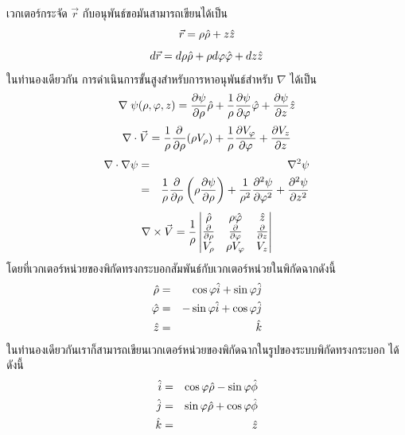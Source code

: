 เวกเตอร์กระจัด $\vec{r}$ กับอนุพันธ์ขอมันสามารถเขียนได้เป็น
\begin{equation}\label{CylinderVecR}
\vec{r} = \rho\hat{\rho} + z\hat{z}
\end{equation}
\begin{equation}\label{CylinderDR}
d\vec{r} = d\rho\hat{\rho} + \rho d\varphi\hat{\varphi} + dz\hat{z}
\end{equation}
ในทำนองเดียวกัน การดำเนินการขั้นสูงสำหรับการหาอนุพันธ์สำหรับ $\nabla$ ได้เป็น
\begin{equation}\label{CylinderDel}
\nabla\;\psi(\rho, \varphi, z) = \frac{\partial\psi}{\partial\rho}\hat{\rho} + \frac{1}{\rho}\frac{\partial\psi}{\partial\varphi}\hat{\varphi} + \frac{\partial\psi}{\partial z}\hat{z}
\end{equation}
\begin{equation}\label{CylinderDiv}
\nabla\cdot\vec{V} = \frac{1}{\rho}\frac{\partial}{\partial\rho}(\rho V_\rho) + \frac{1}{\rho}\frac{\partial V_\varphi}{\partial \varphi} + \frac{\partial V_z}{\partial z}
\end{equation}
\begin{eqnarray}\label{CylinderDivSqr}
\nabla\cdot\nabla\psi &=& \nabla^2\psi \nonumber \\
        &=& \frac{1}{\rho}\frac{\partial}{\partial\rho}\left(\rho\frac{\partial\psi}{\partial\rho}\right) + \frac{1}{\rho^2}\frac{\partial^2\psi}{\partial\varphi^2} + \frac{\partial^2\psi}{\partial z^2}
\end{eqnarray}
\begin{equation}\label{CylinderCurl}
\nabla\times\vec{V} = \frac{1}{\rho}\begin{vmatrix} \hat{\rho} & \rho\hat{\varphi} & \hat{z} \\ \frac{\partial}{\partial\rho} & \frac{\partial}{\partial\varphi} & \frac{\partial}{\partial z} \\ V_\rho & \rho V_\varphi & V_z \end{vmatrix}
\end{equation}
โดยที่เวกเตอร์หน่วยของพิกัดทรงกระบอกสัมพันธ์กับเวกเตอร์หน่วยในพิกัดฉากดังนี้
\begin{eqnarray}\label{CylinderUnitVec}
\hat{\rho} &=& \cos\varphi\hat{i} + \sin\varphi\hat{j} \nonumber \\
\hat{\varphi} &=& - \sin\varphi\hat{i} + \cos\varphi\hat{j} \\
\hat{z} &=& \hat{k} \nonumber
\end{eqnarray}
ในทำนองเดียวกันเราก็สามารถเขียนเวกเตอร์หน่วยของพิกัดฉากในรูปของระบบพิกัดทรงกระบอก ได้ดังนี้
\begin{eqnarray}\label{CylinderUnitVecXYZ}
\hat{i} &=& \cos\varphi\hat{\rho} - \sin\varphi\hat{\phi} \nonumber \\
\hat{j} &=& \sin\varphi\hat{\rho} + \cos\varphi\hat{\phi} \\
\hat{k} &=& \hat{z} \nonumber
\end{eqnarray}

